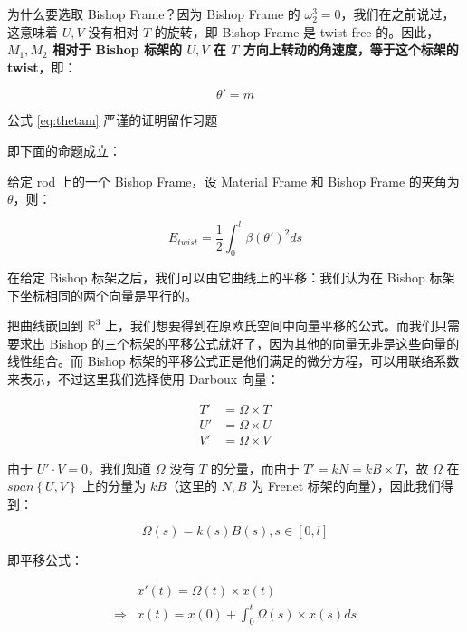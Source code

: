 \documentclass{notes}
\begin{document}
为什么要选取 Bishop Frame？因为 Bishop Frame 的 $\omega_2^3 = 0$，我们在之前说过，这意味着 $U, V$ 没有相对 $T$ 的旋转，即 Bishop Frame 是 twist-free 的。因此，\textbf{$M_1, M_2$ 相对于 Bishop 标架的 $U, V$ 在 $T$ 方向上转动的角速度，等于这个标架的 twist}，即：

\begin{equation} \label{eq:thetam}
	\theta' = m
\end{equation}

\begin{remark}
	公式 \ref{eq:thetam} 严谨的证明留作习题
\end{remark}

即下面的命题成立：

\begin{proposition}
	给定 rod 上的一个 Bishop Frame，设 Material Frame 和 Bishop Frame 的夹角为 $\theta$，则：

	\begin{equation}
		E_{twist} = \frac{1}{2} \int_{0}^{l}\beta (\theta')^2 ds
	\end{equation}
\end{proposition}

在给定 Bishop 标架之后，我们可以由它曲线上的平移：我们认为在 Bishop 标架下坐标相同的两个向量是平行的。

把曲线嵌回到 $\mathbb{R}^3$ 上，我们想要得到在原欧氏空间中向量平移的公式。而我们只需要求出 Bishop 的三个标架的平移公式就好了，因为其他的向量无非是这些向量的线性组合。而 Bishop 标架的平移公式正是他们满足的微分方程，可以用联络系数来表示，不过这里我们选择使用 Darboux 向量：

\begin{equation}
	\begin{aligned}
		T' &= \Omega \times T \\
		U' &= \Omega \times U \\
		V' &= \Omega \times V
	\end{aligned}
\end{equation}

由于 $U'\cdot V = 0$，我们知道 $\Omega$ 没有 $T$ 的分量，而由于 $T' = kN = kB \times T$，故 $\Omega$ 在 $span \left\lbrace U, V \right\rbrace$ 上的分量为 $kB$（这里的 $N, B$ 为 Frenet 标架的向量），因此我们得到：

\begin{equation}
	\Omega(s) = k(s)B(s), s \in [0, l]
\end{equation}

即平移公式：

\begin{equation}
	\begin{aligned}
		&x'(t) = \Omega(t) \times x(t) \\
		\Rightarrow &x(t) = x(0) + \int_{0}^{t} \Omega(s) \times x(s) ds
	\end{aligned}
\end{equation}
\end{document}
